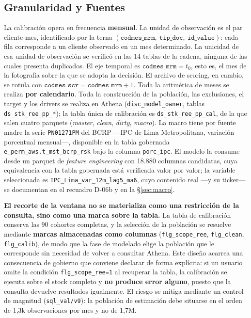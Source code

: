 \documentclass[12pt, a4paper]{article}
\begin{document}
\subsection{Granularidad y Fuentes}
La calibración opera en frecuencia \textbf{mensual}. La unidad de observación es el par
cliente-mes, identificado por la terna
$(\texttt{codmes\_mrm},\ \texttt{tip\_doc},\ \texttt{id\_value})$: cada fila corresponde a un
cliente observado en un mes determinado. La unicidad de esa unidad de observación se verificó en
las 14 tablas de la cadena, ninguna de las cuales presenta duplicados. El eje temporal es
$\texttt{codmes\_mrm}=t_0$, esto es, el mes de la fotografía sobre la que se adopta la decisión.
El archivo de scoring, en cambio, se rotula con
$\texttt{codmes\_scr}=\texttt{codmes\_mrm}+1$. Toda la aritmética de meses se realiza
\textbf{por calendario}. Toda la construcción de la población, las exclusiones, el target y los
drivers se realiza en Athena (\texttt{disc\_model\_owner}, tablas
\texttt{ds\_stk\_ree\_pp\_*}); la tabla única de calibración es
\texttt{ds\_stk\_ree\_pp\_cal}, de la que salen cuatro parquets (\emph{master}, \emph{clean},
\emph{dirty}, \emph{macro}). La macro tiene por fuente madre la serie \texttt{PN01271PM} del BCRP
---IPC de Lima Metropolitana, variación porcentual mensual---, disponible en la tabla gobernada
\texttt{e\_perm\_aws.t\_mst\_bcrp\_rsk} bajo la columna \texttt{porc\_ipc}. El modelo la consume
desde un parquet de \emph{feature engineering} con 18.880 columnas candidatas, cuya equivalencia
con la tabla gobernada está verificada valor por valor; la variable seleccionada es
\texttt{IPC\_Lima\_var\_12m\_lag5\_ma6}, cuyo contenido real ---y su ticker--- se documentan en
el recuadro D-06b y en la \S\ref{sec:macro}.

\textbf{El recorte de la ventana no se materializa como una restricción de la consulta, sino como
una marca sobre la tabla.} La tabla de calibración conserva las 90 cohortes completas, y la
selección de la población se resuelve mediante \textbf{marcas almacenadas como columnas}
(\texttt{flg\_scope\_ree}, \texttt{flg\_clean}, \texttt{flg\_calib}), de modo que la fase de
modelado elige la población que le corresponde sin necesidad de volver a consultar Athena. Este
diseño acarrea una consecuencia de gobierno que conviene declarar de forma explícita: si un
usuario omite la condición \texttt{flg\_scope\_ree=1} al recuperar la tabla, la calibración se
ejecuta sobre el stock completo y \textbf{no produce error alguno}, puesto que la consulta
devuelve resultados igualmente. El riesgo se mitiga mediante un control de magnitud
(\texttt{sql\_val/v9}): la población de estimación debe situarse en el orden de 1{,}3k
observaciones por mes y no de 1{,}7M.
\end{document}
